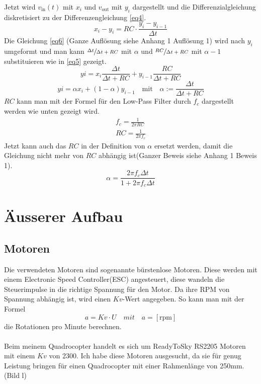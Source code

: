 \documentclass[12pt,a4paper, ngerman]{article}
\begin{document}
Jetzt wird $v_{\text{in}}(t)$ mit $x_{i}$ und $v_{\text{out}}$ mit $y_{i}$ dargestellt und die Differenzialgleichung diskretisiert zu der Differenzengleichung \ref{eq4}.
\begin{equation}\label{eq4}
x_{i}-y_{i}=RC\cdot \frac{y_{i}-y_{i-1}}{\Delta t}
\end{equation}
Die Gleichung \ref{eq6} (Ganze Auflösung siehe Anhang 1 Auflösung 1) wird nach $y_{i}$ umgeformt und man kann $\sfrac{\Delta t}{\Delta t+RC}$  mit $\alpha$ und $\sfrac{RC}{\Delta t + RC}$ mit $\alpha-1$ substituieren wie in \ref{eq5} gezeigt.
\begin{equation} \label{eq6}
y{i}=x_{i}\frac{\Delta t}{\Delta t+RC} + y_{i-1}\frac{RC}{\Delta t+RC}
\end{equation} 
\begin{equation}\label{eq5}
y{i}=\alpha x_{i} + (1-\alpha)y_{i-1} \quad \text{mit} \quad \alpha:=\frac{\Delta t}{\Delta t+RC}
\end{equation}
$RC$ kann man mit der Formel für den Low-Pass Filter durch $f_{c}$ dargestellt werden wie unten gezeigt wird.
\begin{align*}
f_{c} = \frac{1}{2\pi RC} \\
RC = \frac{1}{2\pi f_{c}} 
\end{align*}
Jetzt kann auch das $RC$ in der Definition von $\alpha$ ersetzt werden, damit die Gleichung nicht mehr von $RC$ abhängig ist(Ganzer Beweis siehe Anhang 1 Beweis 1).
\begin{equation*}
\alpha = \frac{2\pi f_{c}\Delta t}{1+2\pi f_{c}\Delta t} 
\end{equation*}
\newpage
\section{Äusserer Aufbau}
\subsection{Motoren}
Die verwendeten Motoren sind sogenannte bürstenlose Motoren. Diese werden mit einem Electronic Speed Controller(ESC) angesteuert, diese wandeln die Steuerimpulse in die richtige Spannung für den Motor. Da ihre RPM von Spannung abhängig ist, wird einen $Kv$-Wert angegeben. So kann man mit der Formel
\begin{equation}
a=Kv\cdot U \quad mit \quad a=[\text{rpm}]
\end{equation}
die Rotationen pro Minute berechnen.\\ \\
Beim meinem Quadrocopter handelt es sich um ReadyToSky RS2205 Motoren mit einem $Kv$ von 2300. Ich habe diese Motoren ausgesucht, da sie für genug Leistung bringen für einen Quadrocopter mit einer Rahmenlänge von 250mm.(Bild l)
\end{document}
